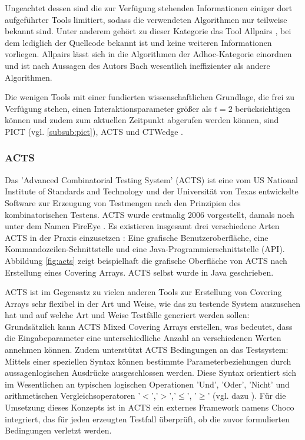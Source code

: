 Ungeachtet dessen sind die zur Verfügung stehenden Informationen einiger dort aufgeführter Tools limitiert, sodass die verwendeten Algorithmen nur teilweise bekannt sind. Unter anderem gehört zu dieser Kategorie das Tool Allpairs \cite{bach2012allpairs}, bei dem lediglich der Quellcode bekannt ist und keine weiteren Informationen vorliegen. Allpairs lässt sich in die Algorithmen der Adhoc-Kategorie einordnen und ist nach Aussagen des Autors Bach \cite{bach2012allpairs} wesentlich ineffizienter als andere Algorithmen.

Die wenigen Tools mit einer fundierten wissenschaftlichen Grundlage, die frei zu Verfügung stehen, einen Interaktionsparameter größer als $t=2$ berücksichtigen können und zudem zum aktuellen Zeitpunkt abgerufen werden können, sind PICT (vgl. \autoref{subsub:pict}), ACTS \cite{yu2013acts} und CTWedge \cite{ctwedge}. 


\subsubsection{ACTS}\label{subsub:acts}

Das 'Advanced Combinatorial Testing System' (ACTS) \cite{yu2013acts} ist eine vom US National Institute of Standards and Technology und der Universität von Texas entwickelte Software zur Erzeugung von Testmengen nach den Prinzipien des kombinatorischen Testens. ACTS wurde erstmalig 2006 vorgestellt, damals noch unter dem Namen FireEye \cite{lei2007ipog}. Es existieren insgesamt drei verschiedene Arten ACTS in der Praxis einzusetzen \cite{yu2013acts}: Eine grafische Benutzeroberfläche, eine Kommandozeilen-Schnittstelle und eine Java-Programmierschnittstelle (API). Abbildung \ref{fig:acts} zeigt beispielhaft die grafische Oberfläche von ACTS nach Erstellung eines Covering Arrays. ACTS selbst wurde in Java geschrieben.

ACTS ist im Gegensatz zu vielen anderen Tools zur Erstellung von Covering Arrays sehr flexibel in der Art und Weise, wie das zu testende System auszusehen hat und auf welche Art und Weise Testfälle generiert werden sollen: Grundsätzlich kann ACTS Mixed Covering Arrays erstellen, was bedeutet, dass die Eingabeparameter eine unterschiedliche Anzahl an verschiedenen Werten annehmen können. Zudem unterstützt ACTS Bedingungen an das Testsystem: Mittels einer speziellen Syntax können bestimmte Parameterbeziehungen durch aussagenlogischen Ausdrücke ausgeschlossen werden. Diese Syntax orientiert sich im Wesentlichen an typischen logischen Operationen 'Und', 'Oder', 'Nicht' und arithmetischen Vergleichsoperatoren '$<$','$>$','$\leq$', '$\geq$' (vgl. dazu \cite{yu2013acts}). Für die Umsetzung dieses Konzepts ist in ACTS ein externes Framework namens Choco \cite{solver} integriert, das für jeden erzeugten Testfall überprüft, ob die zuvor formulierten Bedingungen verletzt werden.

